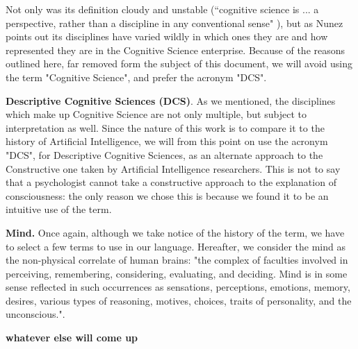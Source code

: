\documentclass[../main.tex]{subfiles}
\begin{document}
Not only was its definition cloudy and unstable (“cognitive science is ... a perspective, rather than a discipline in any conventional sense" \cite{sheehyCognitiveScience1995}), but as Nunez points out its disciplines have varied wildly in which ones they are and how represented they are in the Cognitive Science enterprise. Because of the reasons outlined here, far removed form the subject of this document, we will avoid using the term "Cognitive Science", and prefer the acronym "DCS".

\vspace{5pt}
\textbf{Descriptive Cognitive Sciences (DCS)}. As we mentioned, the disciplines which make up Cognitive Science are not only multiple, but subject to interpretation as well. Since the nature of this work is to compare it to the history of Artificial Intelligence, we will from this point on use the acronym "DCS", for Descriptive Cognitive Sciences, as an alternate approach to the Constructive one taken by Artificial Intelligence researchers. This is not to say that a psychologist cannot take a constructive approach to the explanation of consciousness: the only reason we chose this is because we found it to be an intuitive use of the term.

\vspace{5pt}
\textbf{Mind.} Once again, although we take notice of the history of the term, we have to select a few terms to use in our language. Hereafter, we consider the mind as the non-physical correlate of human brains: "the complex of faculties involved in perceiving, remembering, considering, evaluating, and deciding. Mind is in some sense reflected in such occurrences as sensations, perceptions, emotions, memory, desires, various types of reasoning, motives, choices, traits of personality, and the unconscious."\cite{Mind}.

\vspace{5pt}
\textbf{whatever else will come up}
\end{document}
